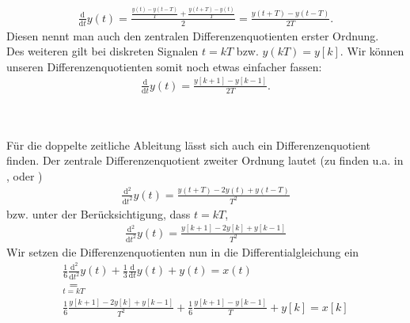 \documentclass[11pt,a4paper,DIV=12]{scrartcl}
\begin{document}
\begin{gather}
	\frac{\mathrm{d}}{\mathrm{d}t}y(t)=\frac{\frac{y(t)-y(t-T)}{T}+\frac{y(t+T)-y(t)}{T}}{2}=\frac{y(t+T)-y(t-T)}{2T}.
\end{gather}
Diesen nennt man auch den zentralen Differenzenquotienten erster Ordnung.\\
Des weiteren gilt bei diskreten Signalen $t=kT$ bzw. $y(kT)=y[k]$. Wir können unseren Differenzenquotienten somit noch etwas einfacher fassen:
\begin{gather}
	\frac{\mathrm{d}}{\mathrm{d}t}y(t)=\frac{y[k+1]-y[k-1]}{2T}.
\end{gather}
\\
\begin{figure}[h]
\centering
{}
\end{figure}
\\
Für die doppelte zeitliche Ableitung lässt sich auch ein Differenzenquotient finden. Der zentrale Differenzenquotient zweiter Ordnung lautet (zu finden u.a. in \cite[Kap. 5, S. 138]{Reinhardt2012}, \cite[Kap. 5, S. 149]{MeisterSonar2019} oder \cite[Kap. 8, S. 184]{Scholz2016})
\begin{gather}
	\frac{\mathrm{d}^2}{\mathrm{d}t^2}y(t)=\frac{y(t+T)-2y(t)+y(t-T)}{T^2}
\end{gather}
bzw. unter der Berücksichtigung, dass $t=kT$,
\begin{gather}
	\frac{\mathrm{d}^2}{\mathrm{d}t^2}y(t)=\frac{y[k+1]-2y[k]+y[k-1]}{T^2}
\end{gather}
Wir setzen die Differenzenquotienten nun in die Differentialgleichung ein
\begin{gather}
	\frac{1}{6}\frac{\mathrm{d}^2}{\mathrm{d}t^2}y(t)+\frac{1}{3}\frac{\mathrm{d}}{\mathrm{d}t}y(t)+y(t)=x(t)\\
	\underset{t=kT}{=}\nonumber\\
	\frac{1}{6}\frac{y[k+1]-2y[k]+y[k-1]}{T^2}+\frac{1}{6}\frac{y[k+1]-y[k-1]}{T}+y[k]=x[k]
\end{gather}
\end{document}
